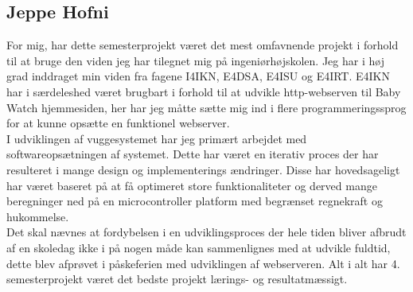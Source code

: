 \subsection*{Jeppe Hofni}
For mig, har dette semesterprojekt været det mest omfavnende projekt i forhold til at bruge den viden jeg har tilegnet mig på ingeniørhøjskolen. Jeg har i høj grad inddraget min viden fra fagene I4IKN, E4DSA, E4ISU og E4IRT. E4IKN har i særdeleshed været brugbart i forhold til at udvikle http-webserven til Baby Watch hjemmesiden, her har jeg måtte sætte mig ind i flere programmeringssprog for at kunne opsætte en funktionel webserver.\\
I udviklingen af vuggesystemet har jeg primært arbejdet med softwareopsætningen af systemet. Dette har været en iterativ proces der har resulteret i mange design og implementerings ændringer. Disse har hovedsageligt har været baseret på at få optimeret store funktionaliteter og derved mange beregninger ned på en microcontroller platform med begrænset regnekraft og hukommelse.\\
Det skal nævnes at fordybelsen i en udviklingsproces der hele tiden bliver afbrudt af en skoledag ikke i på nogen måde kan sammenlignes med at udvikle fuldtid, dette blev afprøvet i påskeferien med udviklingen af webserveren. Alt i alt har 4. semesterprojekt været det bedste projekt lærings- og resultatmæssigt.

